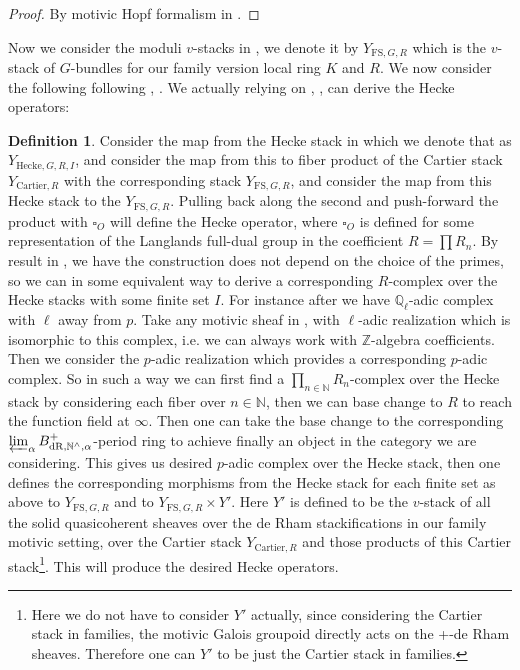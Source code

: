 \documentclass[12pt]{article}
\theoremstyle{definition}
\newtheorem{definition}{Definition}
\begin{document}
\begin{proof}
By motivic Hopf formalism in \cite{2A}.
\end{proof}




\indent Now we consider the moduli $v$-stacks in \cite{2LH}, we denote it by $Y_{\mathrm{FS},G,R}$ which is the $v$-stack of $G$-bundles for our family version local ring $K$ and $R$. We now consider the following following \cite{1FS}, \cite{1GL}. We actually relying on \cite{1FS}, \cite{1S5}, \cite{1S6}  can derive the Hecke operators:

\begin{definition}
Consider the map from the Hecke stack in \cite{2LH} which we denote that as $Y_{\mathrm{Hecke},G,R,I}$, and consider the map from this to fiber product of the Cartier stack $Y_{\mathrm{Cartier},R}$ with the corresponding stack $Y_{\mathrm{FS},G,R}$, and consider the map from this Hecke stack to the $Y_{\mathrm{FS},G,R}$. Pulling back along the second and push-forward the product with $\square_O$ will define the Hecke operator, where $\square_O$ is defined for some representation of the Langlands full-dual group in the coefficient $R=\prod R_n$. By result in \cite{1S5}, \cite{1S6} we have the construction does not depend on the choice of the primes, so we can in some equivalent way to derive a corresponding $R$-complex over the Hecke stacks with some finite set $I$. For instance after \cite{1FS} we have ${\mathbb{Q}}_\ell$-adic complex with $\ell$ away from $p$. Take any motivic sheaf in \cite{1S5}, \cite{1S6} with $\ell$-adic realization which is isomorphic to this complex, i.e. we can always work with $\mathbb{Z}$-algebra coefficients. Then we consider the $p$-adic realization which provides a corresponding $p$-adic complex. So in such a way we can first find a $\prod_{n\in \mathbb{N}}R_n$-complex over the Hecke stack by considering each fiber over $n\in \mathbb{N}$, then we can base change to $R$ to reach the function field at $\infty$. Then one can take the base change to the corresponding $\varprojlim_\alpha B^+_\mathrm{dR,\mathbb{N}^\wedge,\alpha}$-period ring to achieve finally an object in the category we are considering. This gives us desired $p$-adic complex over the Hecke stack, then one defines the corresponding morphisms from the Hecke stack for each finite set as above to $Y_{\mathrm{FS},G,R}$ and to $Y_{\mathrm{FS},G,R}\times Y'$. Here $Y'$ is defined to be the $v$-stack of all the solid quasicoherent sheaves over the de Rham stackifications in our family motivic setting, over the Cartier stack $Y_{\mathrm{Cartier},R}$ and those products of this Cartier stack\footnote{Here we do not have to consider $Y'$ actually, since considering the Cartier stack in families, the motivic Galois groupoid directly acts on the +-de Rham sheaves. Therefore one can $Y'$ to be just the Cartier stack in families.}. This will produce the desired Hecke operators.
\end{definition}
\end{document}
